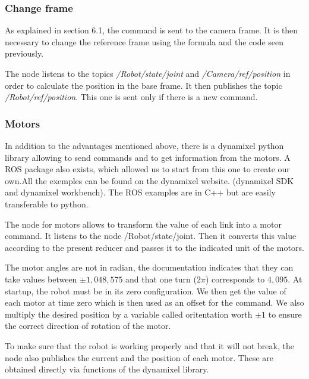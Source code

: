 \subsubsection{Change frame}

As explained in section 6.1, the command is sent to the camera frame. It is then necessary to change the reference frame using the formula and the code seen previously. 

\bigbreak
The node listens to the topics \textit{/Robot/state/joint} and \textit{/Camera/ref/position} in order to calculate the position in the base frame. It then publishes the topic \textit{/Robot/ref/position}. This one is sent only if there is a new command.

\subsubsection{Motors}

In addition to the advantages mentioned above, there is a dynamixel python library allowing to send commands and to get information from the motors. A ROS package also exists, which allowed us to start from this one to create our own.All the exemples can be found on the dynamixel website. (dynamixel SDK and dynamixel workbench). The ROS examples are in C++ but are easily transferable to python.

\bigbreak
The node for motors allows to transform the value of each link into a motor command. It listens to the node /Robot/state/joint. Then it converts this value according to the present reducer and passes it to the indicated unit of the motors.

\bigbreak
The motor angles are not in radian, the documentation indicates that they can take values between $\pm1,048,575$ and that one turn ($2\pi$) corresponds to $4,095$. At startup, the robot must be in its zero configuration. We then get the value of each motor at time zero which is then used as an offset for the command. We also multiply the desired position by a variable called oritentation worth $\pm1$ to ensure the correct direction of rotation of the motor.

\bigbreak
To make sure that the robot is working properly and that it will not break, the node also publishes the current and the position of each motor. These are obtained directly via functions of the dynamixel library.

